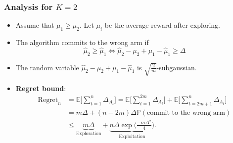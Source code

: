 \documentclass[usenames,dvipsnames, 10pt]{beamer}
\newcommand{\Prob}{\mathbb{P}}
\newcommand{\E}{\mathbb{E}}
\begin{document}
\begin{frame}
	\frametitle{Analysis for $K = 2$}
	\vspace{0.1cm}
	\begin{itemize}
		\item Assume that $\mu_1 \geq \mu_2$.  Let $\mu_i$ be the average reward after exploring.
		\item The algorithm commits to the wrong arm if
		\begin{equation*}
		\hat\mu_2 \geq \hat\mu_1 \iff \hat\mu_2 - \mu_2 + \mu_1 - \hat\mu_1 \geq \Delta
		\end{equation*}
		\item The random variable  $\hat\mu_2 - \mu_2 + \mu_1 - \hat\mu_1$ is $\sqrt{\frac{2}{m}}$-subgaussian.
		
		\item \textbf{Regret bound}:
		\begin{align*}
		\text{Regret}_n &= \E\Big[\sum_{t= 1}^{n} \Delta_{A_t}\Big] = \E\Big[\sum_{t= 1}^{2m} \Delta_{A_t}\Big] + \E\Big[\sum_{t= 2m+1}^{n} \Delta_{A_t}\Big]\\
		&= m\Delta + (n - 2m) \Delta \Prob(\text{commit to the wrong arm})\\
		&\leq \underbrace{m\Delta}_{\text{Exploration}} + \underbrace{n\Delta \exp\big(\frac{-m\Delta^2}{4}\big)}_{\text{Exploitation}}.
		\end{align*}
	\end{itemize}
\end{frame}
\end{document}
